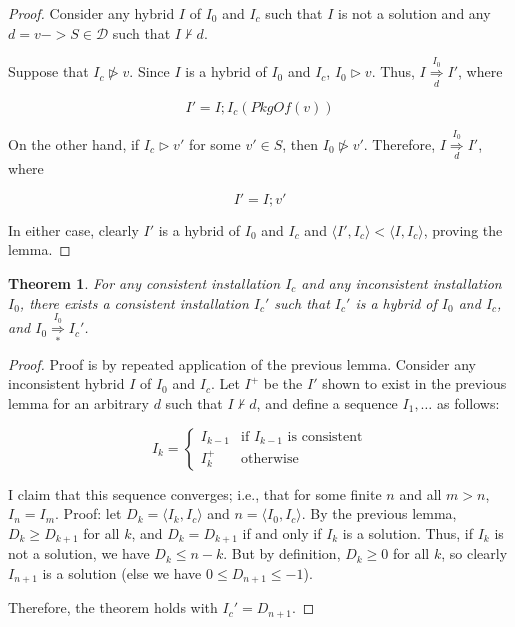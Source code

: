 \documentclass[letterpaper]{article}
\newtheorem{theorem}{Theorem}
\theoremstyle{definition}
\theoremstyle{remark}
\newcommand{\D}{\mathcal{D}}
\newcommand{\pkgof}[1]{PkgOf(#1)}
\newcommand{\idist}[2]{\langle#1,#2\rangle}
\newcommand{\nsol}[2]{\overset{#1}{\underset{#2}{\Rightarrow}}}
\newcommand{\nsolmany}[1]{\overset{#1}{\underset{*}{\Rightarrow}}}
\newcommand{\installs}{\vartriangleright}
\newcommand{\satisfies}{\vdash}
\begin{document}
\begin{proof}
  Consider any hybrid $I$ of $I_0$ and $I_c$ such that $I$ is not a
  solution and any $d=v -> S \in \D$ such that $I \not \satisfies d$.

  Suppose that $I_c \not \installs v$.  Since $I$ is a hybrid of $I_0$
  and $I_c$, $I_0 \installs v$.  Thus, $I \nsol{I_0}{d} I'$, where

  \begin{equation}
    I'=I;I_c(\pkgof{v})
  \end{equation}

  On the other hand, if $I_c \installs v'$ for some $v' \in S$, then
  $I_0 \not \installs v'$.  Therefore, $I \nsol{I_0}{d} I'$, where

  \begin{equation}
    I'=I;v'
  \end{equation}

  In either case, clearly $I'$ is a hybrid of $I_0$ and $I_c$ and
  $\idist{I'}{I_c}<\idist{I}{I_c}$, proving the lemma.
\end{proof}

\begin{theorem}
  For any consistent installation $I_c$ and any inconsistent
  installation $I_0$, there exists a consistent installation $I_c'$
  such that $I_c'$ is a hybrid of $I_0$ and $I_c$, and $I_0
  \nsolmany{I_0} I_c'$.
  \label{thm:succ-sufficient}
\end{theorem}

\begin{proof}
  Proof is by repeated application of the previous lemma.  Consider
  any inconsistent hybrid $I$ of $I_0$ and $I_c$.  Let $I^{+}$ be the
  $I'$ shown to exist in the previous lemma for an arbitrary $d$ such
  that $I \not \satisfies d$, and define a sequence $I_1, \dots$ as
  follows:

  \begin{equation}
    I_k = \begin{cases}
      I_{k-1} & \text{if $I_{k-1}$ is consistent} \\
      I_k^{+} & \text{otherwise}
    \end{cases}
  \end{equation}

  I claim that this sequence converges; i.e., that for some finite $n$
  and all $m>n$, $I_n=I_m$.  Proof: let $D_k=\idist{I_k}{I_c}$ and
  $n=\idist{I_0}{I_c}$.  By the previous lemma, $D_k \geq D_{k+1}$ for
  all $k$, and $D_k=D_{k+1}$ if and only if $I_k$ is a solution.
  Thus, if $I_k$ is not a solution, we have $D_k \leq n-k$.  But by
  definition, $D_k \geq 0$ for all $k$, so clearly $I_{n+1}$ is a
  solution (else we have $0 \leq D_{n+1} \leq -1$).

  Therefore, the theorem holds with $I_c'=D_{n+1}$.
\end{proof}
\end{document}
